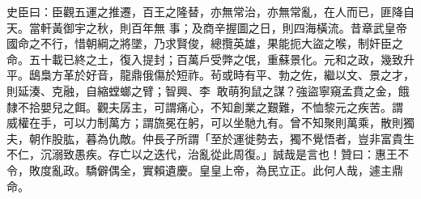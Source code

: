 \begin{pinyinscope}
 史臣曰：臣觀五運之推遷，百王之隆替，亦無常治，亦無常亂，在人而已，匪降自天。當軒黃御宇之秋，則百年無
 事；及商辛握圖之日，則四海橫流。昔章武皇帝國命之不行，惜朝綱之將墜，乃求賢俊，總攬英雄，果能扼大盜之喉，制奸臣之命。五十載已終之土，復入提封；百萬戶受弊之氓，重蘇景化。元和之政，幾致升平。鴟梟方革於好音，龍鼎俄傷於短祚。茍或時有平、勃之佐，繼以文、景之才，則延湊、克融，自縮螳螂之臂；智興、李，敢萌狗鼠之謀？強盜寧窺孟賁之金，餓隸不拾嬰兒之餌。觀夫孱主，可謂痛心，不知創業之艱難，不恤黎元之疾苦。謂
 威權在手，可以力制萬方；謂旒冕在躬，可以坐馳九有。曾不知聚則萬乘，散則獨夫，朝作股肱，暮為仇敵。仲長子所謂「至於運徙勢去，獨不覺悟者，豈非富貴生不仁，沉溺致愚疾。存亡以之迭代，治亂從此周復。」誠哉是言也！贊曰：惠王不令，敗度亂政。驕僻偶全，實賴遺慶。皇皇上帝，為民立正。此何人哉，遽主鼎命。



\end{pinyinscope}